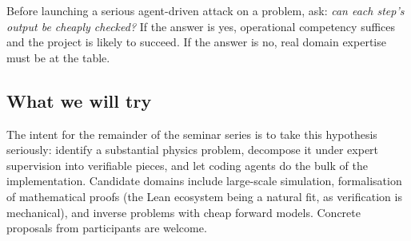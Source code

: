 \begin{keyresult}
  Before launching a serious agent-driven attack on a
  problem, ask: \emph{can each step's output be cheaply
  checked?}  If the answer is yes, operational competency
  suffices and the project is likely to succeed.  If the
  answer is no, real domain expertise must be at the table.
\end{keyresult}

\subsection{What we will try}

The intent for the remainder of the seminar series is to
take this hypothesis seriously: identify a substantial
physics problem, decompose it under expert supervision into
verifiable pieces, and let coding agents do the bulk of the
implementation.  Candidate domains include large-scale
simulation, formalisation of mathematical proofs (the Lean
ecosystem being a natural fit, as verification is mechanical),
and inverse problems with cheap forward models.  Concrete
proposals from participants are welcome.
